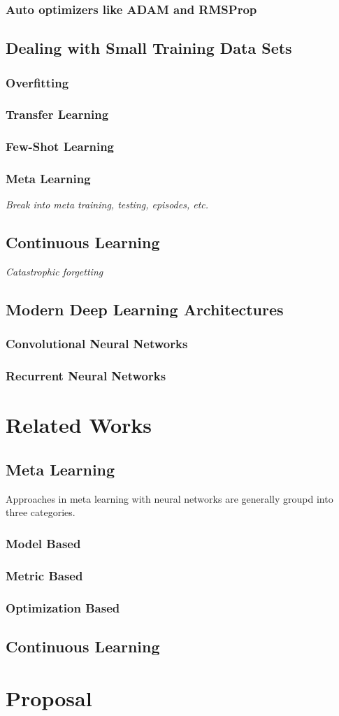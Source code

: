 \documentclass{report}
\begin{document}
	\subsection{Auto optimizers like ADAM and RMSProp}
	
	\section{Dealing with Small Training Data Sets}
	\subsection{Overfitting}
	\subsection{Transfer Learning}
	\subsection{Few-Shot Learning}
	\subsection{Meta Learning}
	\textit{Break into meta training, testing, episodes, etc.}
	\section{Continuous Learning}
	\textit{Catastrophic forgetting}
	\section{Modern Deep Learning Architectures}
	\subsection{Convolutional Neural Networks}
	\subsection{Recurrent Neural Networks}
	
	\chapter{Related Works}
	\section{Meta Learning}
	Approaches in meta learning with neural networks are generally groupd into three categories.
	\subsection{Model Based}
	\subsection{Metric Based}
	\subsection{Optimization Based}
	\section{Continuous Learning}
	
	\chapter{Proposal}
	
\end{document}
